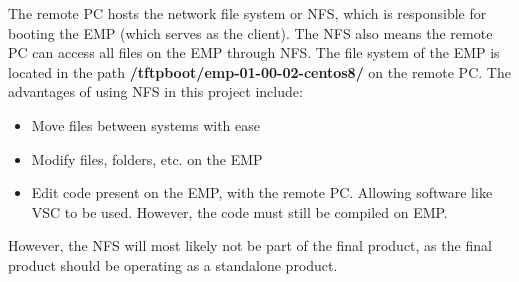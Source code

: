 \noindent The remote PC hosts the network file system or NFS, which is responsible for booting the EMP (which serves as the client). The NFS also means the remote PC can access all files on the EMP through NFS. The file system of the EMP is located in the path \textbf{/tftpboot/emp-01-00-02-centos8/} on the remote PC. The advantages of using NFS in this project include:

\begin{itemize}
    \item Move files between systems with ease
    \vspace{-0.2 cm}
    \item Modify files, folders, etc. on the EMP
    \vspace{-0.2 cm}
    \item Edit code present on the EMP, with the remote PC. Allowing software like VSC to be used. However, the code must still be compiled on EMP.
\end{itemize}

\noindent However, the NFS will most likely not be part of the final product, as the final product should be operating as a standalone product.

